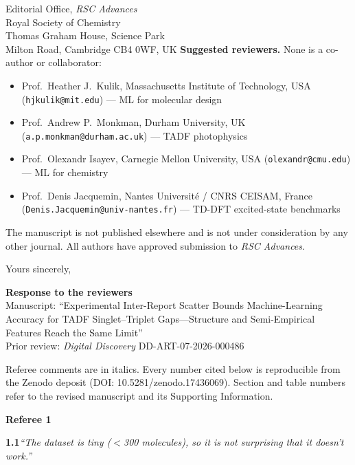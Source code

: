 \documentclass[12pt,a4paper]{letter}
\begin{document}
\begin{letter}{
  Editorial Office, \textit{RSC Advances}\\
  Royal Society of Chemistry\\
  Thomas Graham House, Science Park\\
  Milton Road, Cambridge CB4 0WF, UK
}
\textbf{Suggested reviewers.}
None is a co-author or collaborator:
\begin{itemize}[nosep]
  \item Prof.\ Heather J.\ Kulik, Massachusetts Institute of Technology, USA
  (\texttt{hjkulik@mit.edu}) --- ML for molecular design
  \item Prof.\ Andrew P.\ Monkman, Durham University, UK
  (\texttt{a.p.monkman@durham.ac.uk}) --- TADF photophysics
  \item Prof.\ Olexandr Isayev, Carnegie Mellon University, USA
  (\texttt{olexandr@cmu.edu}) --- ML for chemistry
  \item Prof.\ Denis Jacquemin, Nantes Universit\'{e} / CNRS CEISAM, France
  (\texttt{Denis.Jacquemin@univ-nantes.fr}) --- TD-DFT excited-state benchmarks
\end{itemize}

The manuscript is not published elsewhere and is not under consideration by any
other journal. All authors have approved submission to \textit{RSC Advances}.

\closing{Yours sincerely,}

\end{letter}

\newpage

\begin{center}
  {\large\textbf{Response to the reviewers}}\\[2pt]
  Manuscript: ``Experimental Inter-Report Scatter Bounds Machine-Learning Accuracy
  for TADF Singlet--Triplet Gaps---Structure and Semi-Empirical Features Reach the
  Same Limit''\\
  Prior review: \textit{Digital Discovery} DD-ART-07-2026-000486
\end{center}

\medskip
\noindent
Referee comments are in italics. Every number cited below is reproducible from the
Zenodo deposit (DOI: 10.5281/zenodo.17436069). Section and table numbers refer to
the revised manuscript and its Supporting Information.

\bigskip
\noindent\textbf{\large Referee 1}

\medskip
\noindent\textbf{1.1}\quad\textit{``The dataset is tiny ($<$300 molecules), so it
is not surprising that it doesn't work.''}
\end{document}
